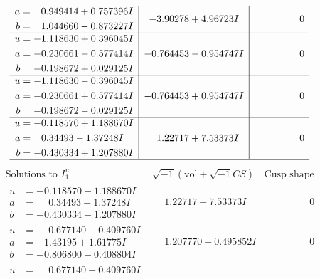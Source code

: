 \documentclass[1p]{elsarticle_modified}
\theoremstyle{definition}
\newcommand{\I}{\sqrt{-1}}
\begin{document}
$$\begin{array}{c|c|c}
\begin{aligned}
a &= \phantom{-}0.949414 + 0.757396 I \\
b &= \phantom{-}1.044660 - 0.873227 I\end{aligned}
 & -3.90278 + 4.96723 I & \phantom{-0.000000 } 0 \\ \hline\begin{aligned}
u &= -1.118630 + 0.396045 I \\
a &= -0.230661 - 0.577414 I \\
b &= -0.198672 + 0.029125 I\end{aligned}
 & -0.764453 - 0.954747 I & \phantom{-0.000000 } 0 \\ \hline\begin{aligned}
u &= -1.118630 - 0.396045 I \\
a &= -0.230661 + 0.577414 I \\
b &= -0.198672 - 0.029125 I\end{aligned}
 & -0.764453 + 0.954747 I & \phantom{-0.000000 } 0 \\ \hline\begin{aligned}
u &= -0.118570 + 1.188670 I \\
a &= \phantom{-}0.34493 - 1.37248 I \\
b &= -0.430334 + 1.207880 I\end{aligned}
 & \phantom{-}1.22717 + 7.53373 I & \phantom{-0.000000 } 0\\
 \hline 
 \end{array}$$\newpage$$\begin{array}{c|c|c}  
\text{Solutions to }I^u_{1}& \I (\text{vol} + \sqrt{-1}CS) & \text{Cusp shape}\\
 \hline 
\begin{aligned}
u &= -0.118570 - 1.188670 I \\
a &= \phantom{-}0.34493 + 1.37248 I \\
b &= -0.430334 - 1.207880 I\end{aligned}
 & \phantom{-}1.22717 - 7.53373 I & \phantom{-0.000000 } 0 \\ \hline\begin{aligned}
u &= \phantom{-}0.677140 + 0.409760 I \\
a &= -1.43195 + 1.61775 I \\
b &= -0.806800 - 0.408804 I\end{aligned}
 & \phantom{-}1.207770 + 0.495852 I & \phantom{-0.000000 } 0 \\ \hline\begin{aligned}
u &= \phantom{-}0.677140 - 0.409760 I \\

\end{aligned}
\end{array}$$
\end{document}

